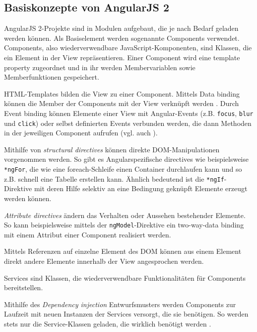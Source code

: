 \subsection{Basiskonzepte von AngularJS 2}
AngularJS 2-Projekte sind in Modulen aufgebaut, die je nach Bedarf geladen werden können. Als Basiselement werden sogenannte Components verwendet. Components, also wiederverwendbare JavaScript-Komponenten, sind Klassen, die ein Element in der View repräsentieren. Einer Component wird eine template property zugeordnet und in ihr werden Membervariablen sowie Memberfunktionen gespeichert.

HTML-Templates bilden die View zu einer Component. Mittels Data binding können die Member der Components mit der View verknüpft werden \cite{LynchAngularComponents}. Durch Event binding können Elemente einer View mit Angular-Events (z.B. \texttt{focus}, \texttt{blur} und \texttt{click}) oder selbst definierten Events verbunden werden, die dann Methoden in der jeweiligen Component aufrufen (vgl. auch  \cite{PrechtAngularTemplateSyntax}).

Mithilfe von \emph{structural directives} können direkte DOM-Manipulationen vorgenommen werden. So gibt es Angularspezifische directives wie beispielsweise \texttt{*ngFor}, die wie eine foreach-Schleife einen Container durchlaufen kann und so z.B. schnell eine Tabelle erstellen kann. Ähnlich bedeutend ist die \texttt{*ngIf}-Direktive mit deren Hilfe selektiv an eine Bedingung geknüpft Elemente erzeugt werden können.

\emph{Attribute directives} ändern das Verhalten oder Aussehen bestehender Elemente. So kann beispielsweise mittels der \texttt{ngModel}-Direktive ein two-way-data binding mit einem Attribut einer Component realisiert werden.

Mittels Referenzen auf einzelne Element des DOM können aus einem Element direkt andere Elemente innerhalb der View angesprochen werden.

Services sind Klassen, die wiederverwendbare Funktionalitäten für Components bereitstellen.

Mithilfe des \emph{Dependency injection} Entwurfsmusters werden Components zur Laufzeit mit neuen Instanzen der Services versorgt, die sie benötigen. So werden stets nur die Service-Klassen geladen, die wirklich benötigt werden \cite{angularDocuBasicArchitecture}.
%
%

